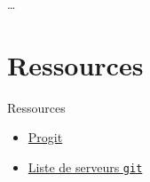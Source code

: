 \documentclass{beamer}
\newcommand{\git}{\texttt{git}}
\begin{document}
\begin{frame}{}
  \begin{center}
  \Huge \dots
  \end{center}
\end{frame}


\section{Ressources}
\begin{frame}{Ressources}
  \begin{itemize}
  \item \href{http://progit.org/about.html}{Progit}
  \item \href{http://git.or.cz/gitwiki/GitHosting}{Liste de serveurs \git}
  \end{itemize}
\end{frame}
\end{document}
